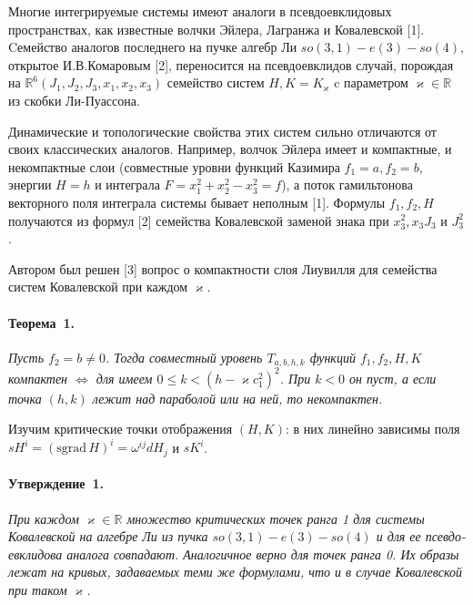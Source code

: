 \documentclass{vzmsthesis}
\begin{document}

\vzmscaption

Многие интегрируемые системы имеют аналоги в псевдоевклидовых пространствах, как известные волчки Эйлера, Лагранжа и Ковалевской [1]. Cемейство аналогов последнего на пучке алгебр Ли $so(3,1)-e(3)-so(4)$, открытое И.В.Комаровым [2], переносится на псевдоевклидов случай, порождая на $\mathbb{R}^6(J_1, J_2, J_3, x_1, x_2, x_3)$ семейство систем $H, K = K_{\varkappa}$ c параметром $\varkappa \in \mathbb{R}$ из  скобки Ли-Пуассона.

Динамические и топологические свойства этих систем сильно отличаются от своих классических аналогов. Например, волчок Эйлера имеет и компактные, и некомпактные слои (совместные уровни функций Казимира $f_1 =a, f_2=b$, энергии $H=h$ и интеграла $F = x_1^2 + x_2^2 - x_3^2 =f$), а поток гамильтонова векторного поля интеграла системы бывает неполным [1]. Формулы $f_1, f_2, H$ получаются из формул [2] семейства Ковалевской заменой знака при $x_3^2, x_3 J_3$ и $J_3^2$. 

Автором был решен [3] вопрос о компактности слоя Лиувилля для семейства систем Ковалевской при каждом $\varkappa$. 
\paragraph{Теорема~1.}
{\it
	Пусть $f_2 = b \ne 0$. Тогда совместный уровень $T_{a, b, h, k}$ функций $f_1, f_2, H, K$ компактен $\Leftrightarrow$ для имеем $0 \le k < (h -\varkappa c_1^2)^2$. При $k <0$ он пуст, а если точка $(h, k)$ лежит над параболой или на ней, то некомпактен.
}

Изучим критические точки отображения $(H, K)$: в них линейно зависимы поля $sH^i = (\mathrm{sgrad}\,H)^i = \omega^{ij} dH_j$ и $sK^i$.

\paragraph{Утверждение~1.}
{\it
	При каждом $\varkappa \in \mathbb{R}$ множество критических точек ранга 1 для системы Ковалевской на алгебре Ли из пучка $so(3,1)-e(3)-so(4)$ и для ее псевдо-евклидова аналога совпадают. Аналогичное верно для точек ранга 0. Их образы лежат на кривых, задаваемых теми же формулами, что и в случае Ковалевской при таком $\varkappa$. 
}
\end{document}
